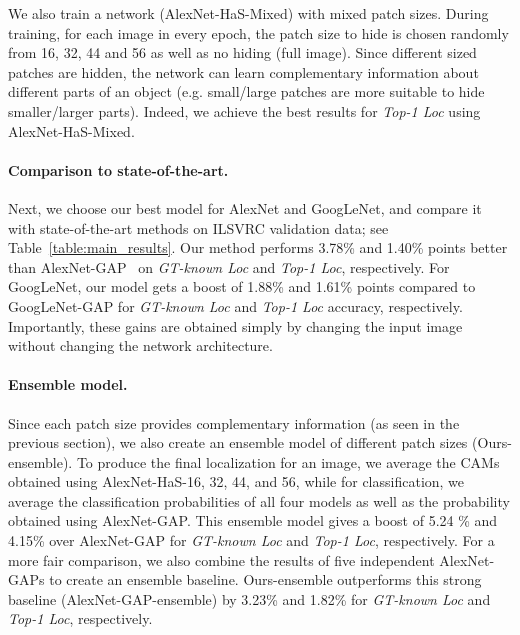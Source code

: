 We also train a network (AlexNet-HaS-Mixed) with mixed patch sizes. During training, for each image in every epoch, the patch size  to hide is chosen randomly from 16, 32, 44 and 56 as well as no hiding (full image).  Since different sized patches are hidden, the network can learn complementary information about different parts of an object (e.g. small/large patches are more suitable to hide smaller/larger parts). Indeed, we achieve the best results for \emph{Top-1 Loc} using AlexNet-HaS-Mixed. 

\vspace{-10pt}
\paragraph{Comparison to state-of-the-art.}  Next, we choose our best model for AlexNet and GoogLeNet, and compare it with state-of-the-art methods on ILSVRC validation data; see Table~\ref{table:main_results}. Our method performs 3.78\% and 1.40\% points better than AlexNet-GAP~\cite{zhou-cvpr2016} on \emph{GT-known Loc} and \emph{Top-1 Loc}, respectively. For GoogLeNet, our model gets a boost of 1.88\% and 1.61\% points compared to GoogLeNet-GAP for \emph{GT-known Loc} and \emph{Top-1 Loc} accuracy, respectively.  Importantly, these gains are obtained simply by changing the input image without changing the network architecture.

\vspace{-10pt}
\paragraph{Ensemble model.}  Since each patch size provides complementary information (as seen in the previous section), we also create an ensemble model of different patch sizes (Ours-ensemble).  To produce the final localization for an image, we average the CAMs obtained using AlexNet-HaS-16, 32, 44, and 56, while for classification, we average the classification probabilities of all four models as well as the probability obtained using AlexNet-GAP.  This ensemble model gives a boost of 5.24 \% and 4.15\% over AlexNet-GAP for \emph{GT-known Loc} and \emph{Top-1 Loc}, respectively.  For a more fair comparison, we also combine the results of five independent AlexNet-GAPs to create an ensemble baseline.  Ours-ensemble outperforms this strong baseline (AlexNet-GAP-ensemble) by 3.23\% and 1.82\% for \emph{GT-known Loc} and \emph{Top-1 Loc}, respectively.








